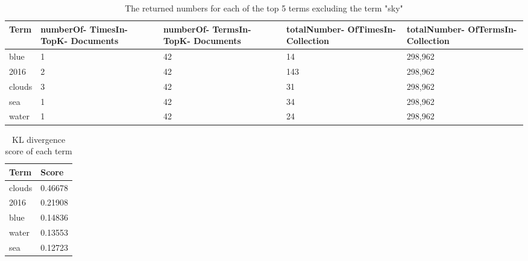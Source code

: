 \begin{table}
	\centering
    \begin{tabular}{|l|p{30mm}|p{30mm}|p{30mm}|p{30mm}|}
		\hline
    \textbf{Term}   & \textbf{numberOf- \newline TimesIn- \newline TopK- \newline Documents} &
		\textbf{numberOf- \newline TermsIn- \newline TopK- \newline Documents} &
		\textbf{totalNumber- \newline OfTimesIn- \newline Collection} &
		\textbf{totalNumber- \newline OfTermsIn- \newline Collection} \\ \hline
    blue   & 1                            & 42                           & 14                             & 298,962                         \\ \hline
    2016   & 2                            & 42                           & 143                            & 298,962                         \\ \hline
    clouds & 3                            & 42                           & 31                             & 298,962                         \\ \hline
    sea    & 1                            & 42                           & 34                             & 298,962                         \\ \hline
    water  & 1                            & 42                           & 24                             & 298,962                         \\ \hline
\end{tabular}
	\caption{The returned numbers for each of the top 5 terms excluding the term "sky"}
	\label{tbl:kl-counts}
\end{table}

\begin{table}
	\centering
    \begin{tabular}{|l|l|}
		\hline
    \textbf{Term}   & \textbf{Score}   \\ \hline
    clouds & 0.46678 \\ \hline
    2016   & 0.21908 \\ \hline
    blue   & 0.14836 \\ \hline
    water  & 0.13553 \\ \hline
    sea    & 0.12723 \\ \hline
    \end{tabular}
	\caption{KL divergence score of each term}
	\label{tbl:kl-score}
\end{table}
